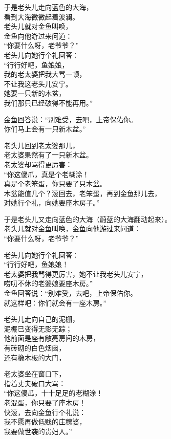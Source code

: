 \documentclass[]{book}
\renewenvironment{quote}{\begin{VF}}{\end{VF}}
\begin{document}
\begin{quote}
于是老头儿走向蓝色的大海，\\
看到大海微微起着波澜。\\
老头儿就对金鱼叫唤，\\
金鱼向他游过来问道：\\
``你要什么呀，老爷爷？''\\
老头儿向她行个礼回答：\\
``行行好吧，鱼娘娘，\\
我的老太婆把我大骂一顿，\\
不让我这老头儿安宁。\\
她要一只新的木盆，\\
我们那只已经破得不能再用。''

金鱼回答说：``别难受，去吧，上帝保佑你。\\
你们马上会有一只新木盆。''

老头儿回到老太婆那儿，\\
老太婆果然有了一只新木盆。\\
老太婆却骂得更厉害：\\
``你这傻爪，真是个老糊涂！\\
真是个老笨蛋，你只要了只木盆。\\
木盆能值几个？滚回去，老笨蛋，再到金鱼那儿去，\\
对她行个礼，向她要座木房子。''

于是老头儿又走向蓝色的大海（蔚蓝的大海翻动起来）。\\
老头儿就对金鱼叫唤，金鱼向他游过来问道：\\
``你要什么呀，老爷爷？''

老头儿向她行个礼回答：\\
``行行好吧，鱼娘娘！\\
老太婆把我骂得更厉害，她不让我老头儿安宁，\\
唠叨不休的老婆娘要座木房。''\\
金鱼回答说：``别难受，去吧，上帝保佑你。\\
就这样吧：你们就会有一座木房。''

老头儿走向自己的泥棚，\\
泥棚已变得无影无踪；\\
他前面是座有敞亮房间的木房，\\
有砖砌的白色烟囱，\\
还有橡木板的大门，

老太婆坐在窗口下，\\
指着丈夫破口大骂：\\
``你这傻瓜，十十足足的老糊涂！\\
老混蛋，你只要了座木房！\\
快滚，去向金鱼行个礼说：\\
我不愿再做低贱的庄稼婆，\\
我要做世袭的贵妇人。''


\end{quote}
\end{document}
